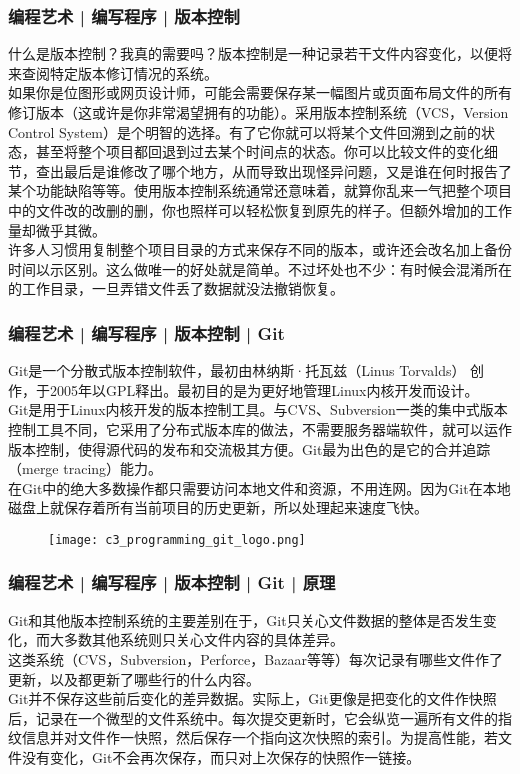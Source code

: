 \begin{frame}
  \frametitle{编程艺术 | 编写程序 | 版本控制}
  什么是版本控制？我真的需要吗？版本控制是一种记录若干文件内容变化，以便将来查阅特定版本修订情况的系统。\\
  \vspace{1em}
  如果你是位图形或网页设计师，可能会需要保存某一幅图片或页面布局文件的所有修订版本（这或许是你非常渴望拥有的功能）。采用版本控制系统（VCS，Version Control System）是个明智的选择。有了它你就可以将某个文件回溯到之前的状态，甚至将整个项目都回退到过去某个时间点的状态。你可以比较文件的变化细节，查出最后是谁修改了哪个地方，从而导致出现怪异问题，又是谁在何时报告了某个功能缺陷等等。使用版本控制系统通常还意味着，就算你乱来一气把整个项目中的文件改的改删的删，你也照样可以轻松恢复到原先的样子。但额外增加的工作量却微乎其微。\\
  \vspace{1em}
  许多人习惯用复制整个项目目录的方式来保存不同的版本，或许还会改名加上备份时间以示区别。这么做唯一的好处就是简单。不过坏处也不少：有时候会混淆所在的工作目录，一旦弄错文件丢了数据就没法撤销恢复。
\end{frame}

\begin{frame}
  \frametitle{编程艺术 | 编写程序 | 版本控制 | \alert{Git}}
  Git是一个\alert{分散式版本控制软件}，最初由\alert{林纳斯·托瓦兹（Linus Torvalds）} 创作，于2005年以GPL释出。最初目的是为更好地管理Linux内核开发而设计。\\
  \vspace{0.5em}
Git是用于Linux内核开发的版本控制工具。与CVS、Subversion一类的集中式版本控制工具不同，它采用了\alert{分布式版本库}的做法，不需要服务器端软件，就可以运作版本控制，使得源代码的发布和交流极其方便。Git最为出色的是它的合并追踪（merge tracing）能力。\\
\vspace{0.5em}
在Git中的绝大多数操作都只需要访问本地文件和资源，不用连网。因为Git在本地磁盘上就保存着所有当前项目的历史更新，所以处理起来速度飞快。
\begin{figure}
  \centering
  \texttt{[image: c3\_programming\_git\_logo.png]}
\end{figure}
\end{frame}

\begin{frame}
  \frametitle{编程艺术 | 编写程序 | 版本控制 | Git | 原理}
Git和其他版本控制系统的主要差别在于，Git只关心文件数据的整体是否发生变化，而大多数其他系统则只关心文件内容的具体差异。\\
  \vspace{1em}
  这类系统（CVS，Subversion，Perforce，Bazaar等等）每次记录有哪些文件作了更新，以及都更新了哪些行的什么内容。\\
  \vspace{1em}
  Git并不保存这些前后变化的差异数据。实际上，Git更像是把变化的文件作快照后，记录在一个微型的文件系统中。每次提交更新时，它会纵览一遍所有文件的指纹信息并对文件作一快照，然后保存一个指向这次快照的索引。为提高性能，若文件没有变化，Git不会再次保存，而只对上次保存的快照作一链接。
\end{frame}

